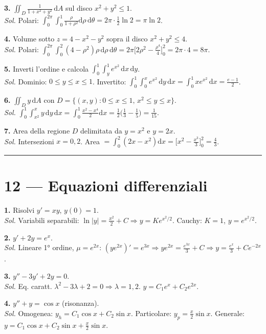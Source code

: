 \documentclass[11pt,a4paper]{article}
\newcommand{\dd}{\mathrm{d}}
\begin{document}
\textbf{3.} $\displaystyle\iint_D \frac{1}{1+x^2+y^2}\,\dd A$ sul disco $x^2+y^2\le 1$.\\
\emph{Sol.} Polari: $\int_0^{2\pi}\!\int_0^1 \tfrac{\rho}{1+\rho^2}\dd\rho\,\dd\theta=2\pi\cdot\tfrac{1}{2}\ln 2=\pi\ln 2$.

\textbf{4.} Volume sotto $z=4-x^2-y^2$ sopra il disco $x^2+y^2\le 4$.\\
\emph{Sol.} Polari: $\int_0^{2\pi}\!\int_0^2 (4-\rho^2)\rho\,\dd\rho\,\dd\theta = 2\pi\big[2\rho^2-\tfrac{\rho^4}{4}\big]_0^2 = 2\pi\cdot 4 = 8\pi$.

\textbf{5.} Inverti l'ordine e calcola $\displaystyle\int_0^1\!\int_y^1 e^{x^2}\,\dd x\,\dd y$.\\
\emph{Sol.} Dominio: $0\le y\le x\le 1$. Invertito: $\int_0^1\!\int_0^x e^{x^2}\,\dd y\,\dd x = \int_0^1 x e^{x^2}\,\dd x = \tfrac{e-1}{2}$.

\textbf{6.} $\displaystyle\iint_D y\,\dd A$ con $D=\{(x,y):0\le x\le 1,\,x^2\le y\le x\}$.\\
\emph{Sol.} $\int_0^1\!\int_{x^2}^x y\,\dd y\,\dd x=\int_0^1 \tfrac{x^2-x^4}{2}\dd x=\tfrac{1}{2}\big(\tfrac{1}{3}-\tfrac{1}{5}\big)=\tfrac{1}{15}$.

\textbf{7.} Area della regione $D$ delimitata da $y=x^2$ e $y=2x$.\\
\emph{Sol.} Intersezioni $x=0,2$. Area $=\int_0^2 (2x-x^2)\dd x=\big[x^2-\tfrac{x^3}{3}\big]_0^2=\tfrac{4}{3}$.

\medskip\hrule\medskip

\section*{12 — Equazioni differenziali}

\textbf{1.} Risolvi $y'=xy$, $y(0)=1$.\\
\emph{Sol.} Variabili separabili: $\ln|y|=\tfrac{x^2}{2}+C\Rightarrow y=Ke^{x^2/2}$. Cauchy: $K=1$, $y=e^{x^2/2}$.

\textbf{2.} $y'+2y=e^x$.\\
\emph{Sol.} Lineare 1° ordine, $\mu=e^{2x}$: $(ye^{2x})'=e^{3x}\Rightarrow ye^{2x}=\tfrac{e^{3x}}{3}+C\Rightarrow y=\tfrac{e^x}{3}+Ce^{-2x}$.

\textbf{3.} $y''-3y'+2y=0$.\\
\emph{Sol.} Eq. caratt. $\lambda^2-3\lambda+2=0\Rightarrow\lambda=1,2$. $y=C_1 e^x+C_2 e^{2x}$.

\textbf{4.} $y''+y=\cos x$ (risonanza).\\
\emph{Sol.} Omogenea: $y_h=C_1\cos x+C_2\sin x$. Particolare: $y_p=\tfrac{x}{2}\sin x$. Generale: $y=C_1\cos x+C_2\sin x+\tfrac{x}{2}\sin x$.
\end{document}
